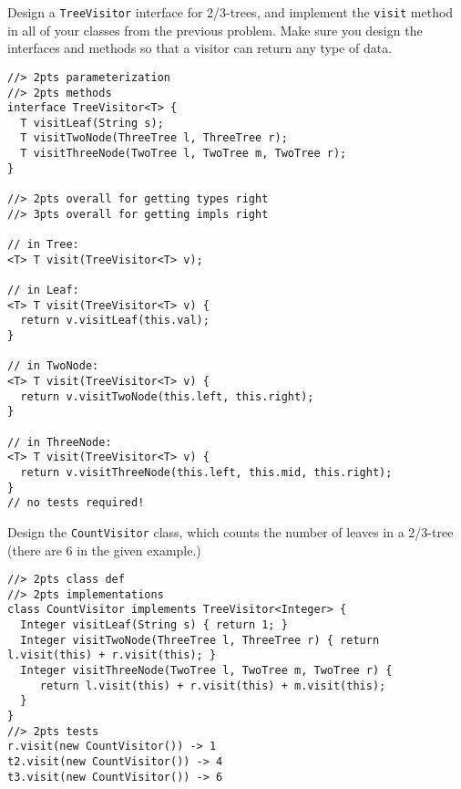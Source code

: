 \documentclass[12pt]{article}                   %
\def\pts#1{\marginpar{\footnotesize \raggedright  \fbox{#1 {\sc Points}}}}
\newenvironment{solution}{\color{red}}{}
\begin{document}
\begin{problem}\pts{22}

Design a \verb|TreeVisitor| interface for 2/3-trees, and implement the
\verb|visit| method in all of your classes from the previous problem.
Make sure you design the interfaces and methods so that a visitor can
return any type of data.

\begin{solution}
\begin{verbatim}
//> 2pts parameterization
//> 2pts methods
interface TreeVisitor<T> {
  T visitLeaf(String s);
  T visitTwoNode(ThreeTree l, ThreeTree r);
  T visitThreeNode(TwoTree l, TwoTree m, TwoTree r);
}

//> 2pts overall for getting types right
//> 3pts overall for getting impls right

// in Tree:
<T> T visit(TreeVisitor<T> v);

// in Leaf:
<T> T visit(TreeVisitor<T> v) { 
  return v.visitLeaf(this.val);
}

// in TwoNode:
<T> T visit(TreeVisitor<T> v) { 
  return v.visitTwoNode(this.left, this.right);
}

// in ThreeNode:
<T> T visit(TreeVisitor<T> v) { 
  return v.visitThreeNode(this.left, this.mid, this.right);
}
// no tests required!
\end{verbatim}
\end{solution}

\newpage

\ifrubric{}
\newpage
\fi


Design the \verb|CountVisitor| class, which counts the number of
leaves in a 2/3-tree (there are 6 in the given example.)

\begin{solution}
\begin{verbatim}
//> 2pts class def
//> 2pts implementations
class CountVisitor implements TreeVisitor<Integer> {
  Integer visitLeaf(String s) { return 1; }
  Integer visitTwoNode(ThreeTree l, ThreeTree r) { return l.visit(this) + r.visit(this); }
  Integer visitThreeNode(TwoTree l, TwoTree m, TwoTree r) { 
     return l.visit(this) + r.visit(this) + m.visit(this);
  }
}
//> 2pts tests
r.visit(new CountVisitor()) -> 1
t2.visit(new CountVisitor()) -> 4
t3.visit(new CountVisitor()) -> 6
\end{verbatim}
\end{solution}


\end{problem}
\end{document}

